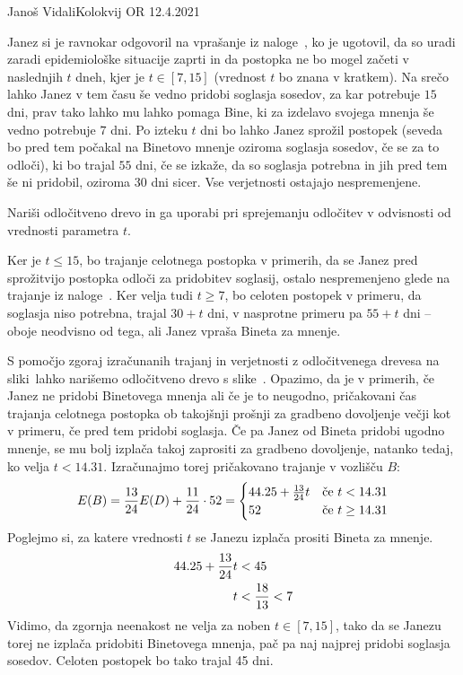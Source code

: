 \begin{naloga}{Janoš Vidali}{Kolokvij OR 12.4.2021}
\begin{vprasanje}
Janez si je ravnokar odgovoril na vprašanje iz naloge~\nal[zemlja],
ko je ugotovil,
da so uradi zaradi epidemiološke situacije zaprti
in da postopka ne bo mogel začeti v naslednjih $t$ dneh,
kjer je $t \in [7, 15]$
(vrednost $t$ bo znana v kratkem).
Na srečo lahko Janez v tem času še vedno pridobi soglasja sosedov,
za kar potrebuje $15$ dni,
prav tako lahko mu lahko pomaga Bine,
ki za izdelavo svojega mnenja še vedno potrebuje $7$ dni.
Po izteku $t$ dni bo lahko Janez sprožil postopek
(seveda bo pred tem počakal na Binetovo mnenje oziroma soglasja sosedov,
če se za to odloči),
ki bo trajal $55$ dni, če se izkaže,
da so soglasja potrebna in jih pred tem še ni pridobil,
oziroma $30$ dni sicer.
Vse verjetnosti ostajajo nespremenjene.

Nariši odločitveno drevo
in ga uporabi pri sprejemanju odločitev v odvisnosti od vrednosti parametra $t$.
\end{vprasanje}

\begin{odgovor}
Ker je $t \le 15$, bo trajanje celotnega postopka v primerih,
da se Janez pred sprožitvijo postopka odloči za pridobitev soglasij,
ostalo nespremenjeno glede na trajanje iz naloge~\res[zemlja].
Ker velja tudi $t \ge 7$,
bo celoten postopek v primeru, da soglasja niso potrebna, trajal $30+t$ dni,
v nasprotne primeru pa $55+t$ dni
-- oboje neodvisno od tega, ali Janez vpraša Bineta za mnenje.

S pomočjo zgoraj izračunanih trajanj
in verjetnosti z odločitvenega drevesa na sliki~\fig[zemlja]
lahko narišemo odločitveno drevo s slike~\fig.
Opazimo,
da je v primerih,
če Janez ne pridobi Binetovega mnenja ali če je to neugodno,
pričakovani čas trajanja celotnega postopka
ob takojšnji prošnji za gradbeno dovoljenje
večji kot v primeru, če pred tem pridobi soglasja.
Če pa Janez od Bineta pridobi ugodno mnenje,
se mu bolj izplača takoj zaprositi za gradbeno dovoljenje,
natanko tedaj, ko velja $t < 14.31$.
Izračunajmo torej pričakovano trajanje v vozlišču $B$:
$$
E(B) = {13 \over 24} E(D) + {11 \over 24} \cdot 52 =
\begin{cases}
44.25 + {13 \over 24} t & \text{če $t < 14.31$} \\
52 & \text{če $t \ge 14.31$}
\end{cases}
$$
Poglejmo si, za katere vrednosti $t$ se Janezu izplača prositi Bineta za mnenje.
\begin{align*}
44.25 + {13 \over 24} t &< 45 \\
t &< {18 \over 13} < 7
\end{align*}
Vidimo, da zgornja neenakost ne velja za noben $t \in [7, 15]$,
tako da se Janezu torej ne izplača pridobiti Binetovega mnenja,
pač pa naj najprej pridobi soglasja sosedov.
Celoten postopek bo tako trajal 45 dni.
\begin{slika}
\makebox[\textwidth][c]{
\pgfslika
}
\end{slika}
\end{odgovor}
\end{naloga}
